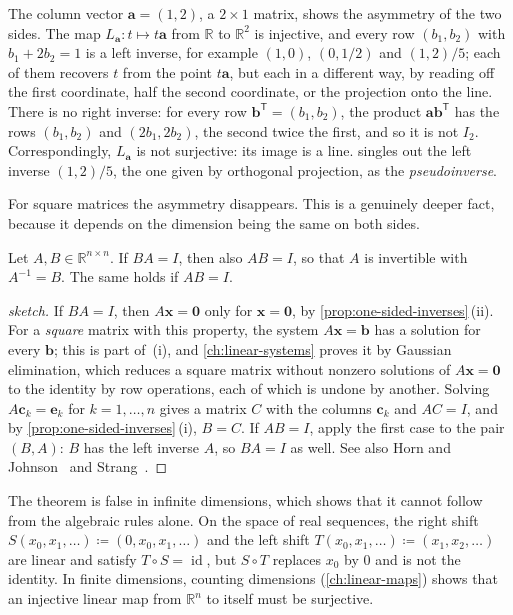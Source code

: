 The column vector $\mathbf a=(1,2)$, a $2\times1$ matrix, shows the asymmetry of the two sides. The map $L_{\mathbf a}\colon t\mapsto t\mathbf a$ from $\mathbb R$ to $\mathbb R^2$ is injective, and every row $(b_1,b_2)$ with $b_1+2b_2=1$ is a left inverse, for example $(1,0)$, $(0,1/2)$ and $(1,2)/5$; each of them recovers $t$ from the point $t\mathbf a$, but each in a different way, by reading off the first coordinate, half the second coordinate, or the projection onto the line. There is no right inverse: for every row $\mathbf b^{\mathsf T}=(b_1,b_2)$, the product $\mathbf a\mathbf b^{\mathsf T}$ has the rows $(b_1,b_2)$ and $(2b_1,2b_2)$, the second twice the first, and so it is not $I_2$. Correspondingly, $L_{\mathbf a}$ is not surjective: its image is a line.  singles out the left inverse $(1,2)/5$, the one given by orthogonal projection, as the \emph{pseudoinverse}.

For square matrices the asymmetry disappears. This is a genuinely deeper fact, because it depends on the dimension being the same on both sides.

\begin{theorem}
\label{thm:one-sided-square}
Let $A,B\in\mathbb R^{n\times n}$. If $BA=I$, then also $AB=I$, so that $A$ is invertible with $A^{-1}=B$. The same holds if $AB=I$.
\end{theorem}

\begin{proof}[sketch]
If $BA=I$, then $A\mathbf x=\mathbf 0$ only for $\mathbf x=\mathbf 0$, by \cref{prop:one-sided-inverses}\,(ii). For a \emph{square} matrix with this property, the system $A\mathbf x=\mathbf b$ has a solution for every $\mathbf b$; this is part of \,(i), and \cref{ch:linear-systems} proves it by Gaussian elimination, which reduces a square matrix without nonzero solutions of $A\mathbf x=\mathbf 0$ to the identity by row operations, each of which is undone by another. Solving $A\mathbf c_k=\mathbf e_k$ for $k=1,\ldots,n$ gives a matrix $C$ with the columns $\mathbf c_k$ and $AC=I$, and by \cref{prop:one-sided-inverses}\,(i), $B=C$. If $AB=I$, apply the first case to the pair $(B,A)$: $B$ has the left inverse $A$, so $BA=I$ as well. See also Horn and Johnson~\cite[Sect.~0.5]{horn2013} and Strang~\cite[Sect.~2.5]{strang2016}.
\end{proof}

The theorem is false in infinite dimensions, which shows that it cannot follow from the algebraic rules alone. On the space of real sequences, the right shift $S(x_0,x_1,\ldots)\coloneqq(0,x_0,x_1,\ldots)$ and the left shift $T(x_0,x_1,\ldots)\coloneqq(x_1,x_2,\ldots)$ are linear and satisfy $T\circ S=\operatorname{id}$, but $S\circ T$ replaces $x_0$ by $0$ and is not the identity. In finite dimensions, counting dimensions (\cref{ch:linear-maps}) shows that an injective linear map from $\mathbb R^n$ to itself must be surjective.


